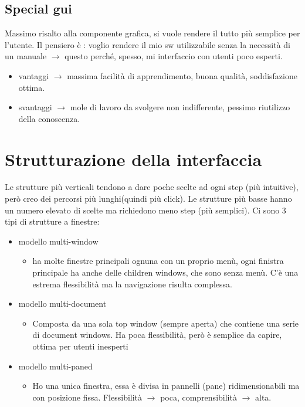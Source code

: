 \documentclass[a4paper,12pt]{report}
\begin{document}
	\subsection{Special gui}
	Massimo risalto alla componente grafica, si vuole rendere il tutto più semplice per l’utente. Il pensiero è : voglio rendere il mio sw utilizzabile senza la necessità di un manuale $\rightarrow$ questo perché, spesso, mi interfaccio con utenti poco esperti. 
	\begin{itemize} 
		\item vantaggi  $\rightarrow$ massima facilità di apprendimento, buona qualità, soddisfazione ottima.
		\item svantaggi $\rightarrow$ mole di lavoro da svolgere non indifferente, pessimo riutilizzo della conoscenza.
	\end{itemize}
	\section{Strutturazione della interfaccia}
	Le strutture più verticali tendono a dare poche scelte ad ogni step (più intuitive), però creo dei percorsi più lunghi(quindi più click). Le strutture più basse hanno un numero elevato di scelte ma richiedono meno step (più semplici). 
	Ci sono 3 tipi di strutture a finestre:
	\begin{itemize}
		\item modello multi-window 
		\begin{itemize}
			\item ha molte finestre principali ognuna con un proprio menù, ogni finistra principale ha anche delle children windows, che sono senza menù. C'è una estrema flessibilità ma la navigazione risulta complessa.
		\end{itemize}
		\item modello multi-document
		\begin{itemize}
			\item Composta da una sola top window (sempre aperta) che contiene una serie di document windows.  Ha poca flessibilità, però è semplice da capire, ottima per utenti inesperti
		\end{itemize}
		\item modello multi-paned
		\begin{itemize}
			\item Ho una unica finestra, essa è divisa in pannelli (pane) ridimensionabili ma con posizione fissa. Flessibilità $\rightarrow$ poca, comprensibilità $\rightarrow$ alta.
		\end{itemize}
	\end{itemize}
\end{document}
